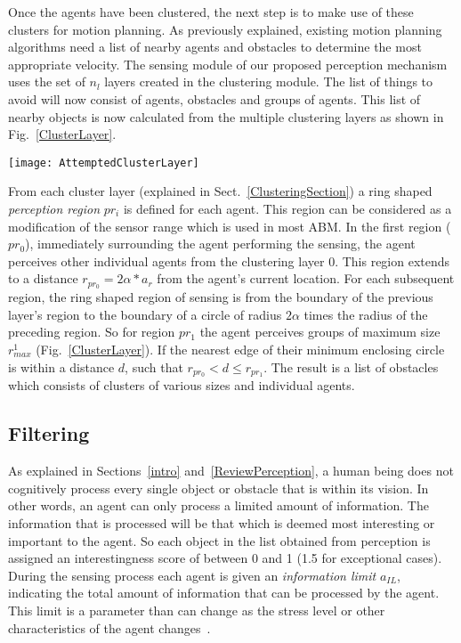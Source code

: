 \documentclass[runningheads,a4paper]{llncs}
\begin{document}
Once the agents have been clustered, the next step is to make use of these clusters for motion planning. As previously explained, existing motion planning algorithms need a list of nearby agents and obstacles to determine the most appropriate velocity. The sensing module of our proposed perception mechanism uses the set of $n_l$ layers created in the clustering module. The list of things to avoid will now consist of agents, obstacles and groups of agents. This list of nearby objects is now calculated from the multiple clustering layers as shown in Fig.~\ref{ClusterLayer}.

\begin{figure*}[!tb]
\centering
\texttt{[image: AttemptedClusterLayer]}
\caption{The figure illustrates how the opaque agent senses objects using 2 clustering layers. The bottom layer is the original environment and the two planes above show the two clustering layers. Clusters in layer 2 are generally bigger than in layer 1. Solid lined circles indicate the normal agents and the clustered agents. The dotted lines show the regions of perception.}
\label{ClusterLayer}
\end{figure*}

From each cluster layer (explained in Sect.~\ref{ClusteringSection}) a ring shaped {\em perception region} $pr_i$ is defined for each agent. This region can be considered as a modification of the sensor range which is used in most ABM.  In the first region ($pr_0$), immediately surrounding the agent performing the sensing, the agent perceives other individual agents from the clustering layer 0. This region extends to a distance $r_{pr_0} = 2\alpha *a_{r}$ from the agent's current location. For each subsequent region, the ring shaped region of sensing is from the boundary of the previous layer's region to the boundary of a circle of radius $2\alpha$ times the radius of the preceding region. So for region $pr_1$ the agent perceives groups of maximum size $r^{1}_{max}$ (Fig.~\ref{ClusterLayer}). If the nearest edge of their minimum enclosing circle is within a distance $d$, such that $ r_{pr_0} < d \leq r_{pr_1}$. The result is a list of obstacles which consists of clusters of various sizes and individual agents.

\subsection{Filtering}

As explained in Sections~\ref{intro} and~\ref{ReviewPerception}, a human being does not cognitively process every single object or obstacle that is within its vision. In other words, an agent can only process a limited amount of information. The information that is processed will be that which is deemed most interesting or important to the agent. So each object in the list obtained from perception is assigned an interestingness score of between 0 and 1 (1.5 for exceptional cases). During the sensing process each agent is given an \emph{information limit} $a_{IL}$, indicating the total amount of information that can be processed by the agent. This limit is a parameter than can change as the stress level or other characteristics of the agent changes~\cite{Ozel:2001tn}.
\end{document}
